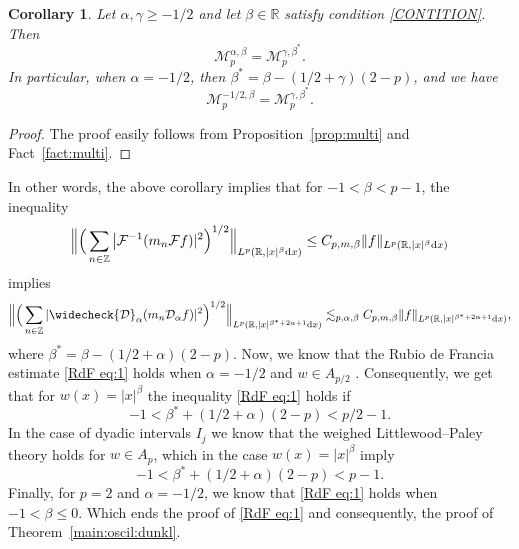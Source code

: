 \documentclass[11pt,oneside]{amsart}
\numberwithin{equation}{section}
\newtheorem{corollary}[equation]{Corollary}
\theoremstyle{definition}
\newcommand{\RR}{\mathbb{R}}
\newcommand{\ZZ}{\mathbb{Z}}
\newcommand{\calF}{\mathcal{F}}
\newcommand{\calM}{\mathcal{M}}
\newcommand{\calD}{\mathcal{D}}
\begin{document}
\begin{corollary}\label{eqmulti}
Let $\alpha,\gamma\geq -1/2$ and let $\beta\in\RR$ satisfy condition \eqref{CONTITION}. Then 
\begin{equation*}
    {\calM}_p^{\alpha,\beta}={\calM}_p^{\gamma,\beta^\ast}.
\end{equation*}
In particular, when \( \alpha = -1/2 \), then \( \beta^\ast = \beta - (1/2 + \gamma)(2 - p) \), and we have
\begin{equation*}
    \mathcal{M}_p^{-1/2, \beta} = \mathcal{M}_p^{\gamma, \beta^\ast}.
\end{equation*}
\end{corollary}
\begin{proof}
The proof easily follows from Proposition~\ref{prop:multi} and Fact~\ref{fact:multi}.
\end{proof}
In other words, the above corollary implies that for $-1<\beta<p-1$, the inequality
\begin{equation*}
    \Big\|\Big(\sum_{n\in\ZZ}\big|\calF^{-1}(m_n \calF f)|^2\Big)^{1/2}\Big\|_{L^p(\RR,|x|^\beta{\rm d}x)}\leq C_{p,m,\beta}\|f\|_{L^p(\RR,|x|^\beta{\rm d}x)}
\end{equation*}
implies
\begin{equation}
    \Big\|\Big(\sum_{n\in\ZZ}|\widecheck{\calD}_\alpha(m_n \calD_\alpha f)|^2\Big)^{1/2}\Big\|_{L^p(\RR,|x|^{\beta^\ast+2\alpha+1}{\rm d}x)}\lesssim_{p,\alpha,\beta} C_{p,m,\beta}\|f\|_{L^p(\RR,|x|^{\beta^\ast+2\alpha+1}{\rm d}x)},
\end{equation}
where $\beta^\ast=\beta-(1/2+\alpha)(2-p)$. Now, we know that the Rubio de Francia estimate \eqref{RdF eq:1} holds when $\alpha=-1/2$ and $w\in A_{p/2}$ . Consequently, we get that for $w(x)=|x|^\beta$ the inequality \eqref{RdF eq:1} holds if
\begin{equation*}
    -1<\beta^\ast+(1/2+\alpha)(2-p)<p/2-1.
\end{equation*}
In the case of dyadic intervals $I_j$ we know that the weighed Littlewood--Paley theory holds for $w\in A_{p}$, which in the case $w(x)=|x|^\beta$ imply
\begin{equation*}
    -1<\beta^\ast+(1/2+\alpha)(2-p)<p-1.
\end{equation*}
Finally, for $p=2$ and $\alpha=-1/2$, we know that \eqref{RdF eq:1} holds when $-1<\beta
\leq0$. Which ends the proof of \eqref{RdF eq:1} and consequently, the proof of Theorem~\ref{main:oscil:dunkl}.
\end{document}
